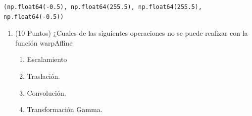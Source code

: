 \documentclass[12pt,a4paper]{article}
\providecommand{\tightlist}{%
  \setlength{\itemsep}{0pt}\setlength{\parskip}{0pt}}\usepackage{longtable,booktabs,array}
\providecommand{\tightlist}{%
  \setlength{\itemsep}{0pt}\setlength{\parskip}{2pt}}
\begin{document}
\begin{verbatim}
(np.float64(-0.5), np.float64(255.5), np.float64(255.5), np.float64(-0.5))
\end{verbatim}

\begin{figure}


\caption{\label{fig-Image01}}

\end{figure}%

\begin{enumerate}
\tightlist
\item
  (10 Puntos) ¿Cuales de las siguientes operaciones no se puede realizar
  con la función warpAffine

  \begin{enumerate}
  \tightlist
  \item
    Escalamiento
  \item
    Traslación.
  \item
    Convolución.
  \item
    Transformación Gamma.
  \end{enumerate}
\end{enumerate}
\end{document}
